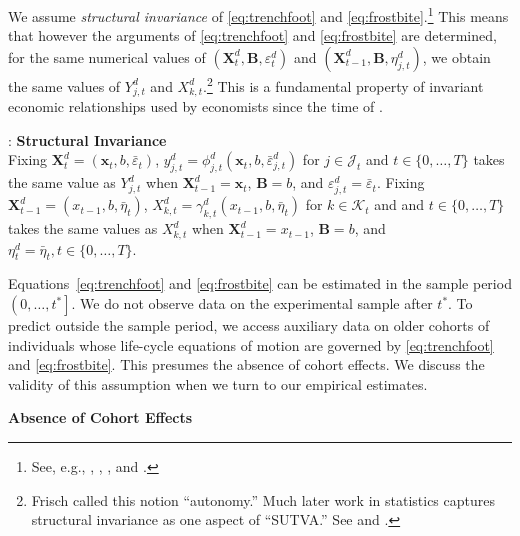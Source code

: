 We assume \emph{structural invariance} of \eqref{eq:trenchfoot} and \eqref{eq:frostbite}.\footnote{See, e.g., \citet{Frisch_1938_autonomy}, \citet{Haavelmo_1943_Econometrica,Haavelmo_1944_Econometrica}, \citet{Hurwicz_1962_structural}, and \citet{Heckman_Pinto_2015_EconometTheory}.} This means that however the arguments of \eqref{eq:trenchfoot} and \eqref{eq:frostbite} are determined, for the same numerical values of $(\bm{X}^d_t, \bm{B}, \varepsilon^d_t)$ and $(\bm{X}^d_{t-1}, \bm{B}, \eta^d_{j,t})$, we obtain the same values of $Y^d_{j,t}$ and $X^d_{k,t}$.\footnote{Frisch called this notion ``autonomy.'' Much later work in statistics captures structural invariance as one aspect of ``SUTVA.'' See \citet{Holland_1986_JASA} and \citet{Heckman_2008_ISR}.} This is a fundamental property of invariant economic relationships used by economists since the time of \citet{Frisch_1938_autonomy}.

\onehalfspacing
\begin{assumption}\label{ass:butts}: \textbf{Structural Invariance} \\
\noindent Fixing $\bm{X}^d_t = (\bm{x}_t, b,\bar{\varepsilon}_t)$, $y^d_{j,t} = \phi^d_{j,t} (\bm{x}_t, b,  \bar{\varepsilon}^d_{j,t})$ for $j \in \mathcal{J}_t$ and $t \in \{0,\ldots,T\}$ takes the same value as $Y^d_{j,t}$ when $\bm{X}^d_{t-1} = \bm{x}_t$, $\bm{B} = b$, and $\varepsilon^d_{j,t} = \bar{\varepsilon}_{t}$. Fixing $\bm{X}^d_{t-1} = (x_{t-1}, b, \bar{\eta}_t)$, $X^d_{k,t} = \gamma^d_{k,t} (x_{t-1}, b, \bar{\eta}_t)$ for $k \in \mathcal{K}_t$ and and $t \in \{0,\ldots,T\}$ takes the same values as $X^d_{k,t}$ when  $\bm{X}^d_{t-1} = x_{t-1}$, $\bm{B} = b$, and $\eta^d_t = \bar{\eta}_t, t \in \{0,\dots,T\}$.
\end{assumption}
\doublespacing

Equations~\eqref{eq:trenchfoot} and \eqref{eq:frostbite} can be estimated in the sample period $\left(0,\ldots,t^{*}\right]$. We do not observe data on the experimental sample after $t^{*}$. To predict outside the sample period, we access auxiliary data on older cohorts of individuals whose life-cycle equations of motion are governed by \eqref{eq:trenchfoot} and \eqref{eq:frostbite}. This presumes the absence of cohort effects. We discuss the validity of this assumption when we turn to our empirical estimates.

\onehalfspacing
\begin{assumption}\label{ass:crotchrot}
\textbf{Absence of Cohort Effects}
\end{assumption}
\doublespacing

